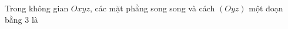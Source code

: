 \begin{ex}
Trong không gian $Oxyz$, các mặt phẳng song song và cách $(Oyz)$ một đoạn bằng $3$ là
\end{ex}
